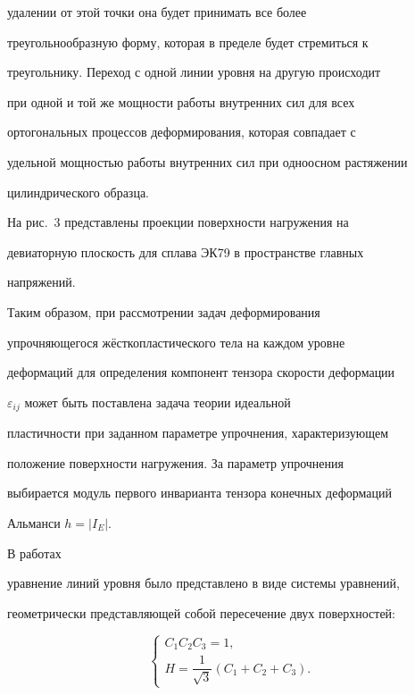 удалении от этой точки она будет принимать все более

треугольнообразную форму, которая в пределе будет стремиться к

треугольнику.  Переход с одной линии уровня на другую происходит

при одной и той же мощности работы внутренних сил для всех

ортогональных процессов деформирования, которая совпадает с

удельной мощностью работы внутренних сил при одноосном растяжении

цилиндрического образца.



На рис.~3 представлены проекции поверхности нагружения на

девиаторную плоскость для сплава ЭК79 в пространстве главных

напряжений.





Таким образом, при рассмотрении задач деформирования

упрочняющегося жёсткопластического тела на каждом уровне

деформаций для определения компонент тензора скорости деформации

$\varepsilon_{ij}$ может быть поставлена задача теории идеальной

пластичности при заданном параметре упрочнения, характеризующем

положение поверхности нагружения. За параметр упрочнения

выбирается модуль первого инварианта тензора конечных деформаций

Альманси $h=|I_E|$.



\smallskip



 В работах

\cite{bukh:bib:KhromKotchGrig,bukh:bib:BukhGrigKotchKhrom}

уравнение линий уровня было представлено в виде системы уравнений,

геометрически представляющей собой пересечение двух поверхностей:

\begin{equation}

\begin{cases}\label{eq:bukh:CondPlast}

    C_1C_2C_3=1, \\

    H=\dfrac{1}{\sqrt{3}}(C_1+C_2+C_3).

\end{cases}

\end{equation}

